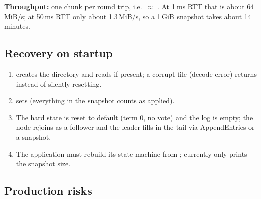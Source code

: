 \textbf{Throughput:} one chunk per round trip, i.e.\ $\approx$ . At 1\,ms RTT
that is about 64\,MiB/s; at 50\,ms RTT only about 1.3\,MiB/s, so a 1\,GiB snapshot takes about
14 minutes.

\subsection{Recovery on startup}

\begin{enumerate}[label=\arabic*., nosep]
  \item {} creates the directory and reads  if
    present; a corrupt file (decode error) returns  instead of silently resetting.
  \item {} sets 
    (everything in the snapshot counts as applied).
  \item The hard state is reset to default (term 0, no vote) and the log is empty; the node rejoins as a
    follower and the leader fills in the tail via AppendEntries or a snapshot.
  \item The application must rebuild its state machine from ;
     currently only prints the snapshot size.
\end{enumerate}

\subsection{Production risks}

